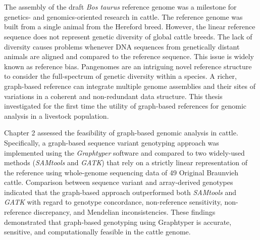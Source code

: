 \documentclass[11 pt, a4paper, notitlepage]{report}
\begin{document}
\newcommand*{\BuildingFromMainFile}{}






\setcounter{tocdepth}{1}
\hypersetup{linkcolor=black}
\tableofcontents
{}
\newpage

\listoffigures 
{}
\newpage

\listoftables 
{}
\newpage

\section*{}
\thispagestyle{plain}

\setlength{\parskip}{\baselineskip}
\doublespacing
The assembly of the draft \emph{Bos taurus }reference genome was a milestone for genetics- and genomics-oriented research in cattle. The reference genome was built from a single animal from the Hereford breed. However, the linear reference sequence does not represent genetic diversity of global cattle breeds. The lack of diversity  causes problems whenever DNA sequences from genetically distant animals are aligned and compared to the reference sequence. This issue is widely known as reference bias. Pangenomes are an intriguing novel reference structure to consider the full-spectrum of genetic diversity within a species. A richer, graph-based reference can integrate multiple  genome assemblies and their sites of variations in a coherent and non-redundant data structure. This thesis investigated for the first time the utility of graph-based references for genomic analysis in a livestock population.

Chapter 2 assessed the feasibility of graph-based genomic analysis in cattle. Specifically, a graph-based sequence variant genotyping approach was implemented using the\emph{ Graphtyper} software and compared to two widely-used methods (\emph{SAMtools } and \emph{GATK}) that rely on a strictly linear representation of the reference using whole-genome sequencing data of 49 Original Braunvieh cattle. Comparison between sequence variant and array-derived genotypes indicated that the graph-based approach outperformed both \emph{SAMtools} and \emph{GATK} with regard to genotype concordance, non-reference sensitivity, non-reference discrepancy, and Mendelian inconsistencies. These findings demonstrated that graph-based genotyping using Graphtyper is accurate, sensitive, and computationally feasible in the cattle genome. 
\end{document}
